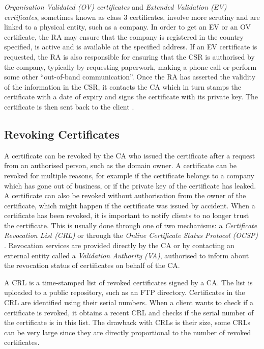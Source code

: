 \documentclass{style/kththesis}
\begin{document}
\emph{Organisation Validated (OV) certificates} and \emph{Extended Validation (EV) certificates}, sometimes known as class 3 certificates, involve more scrutiny and are linked to a physical entity, such as a company. In order to get an EV or an OV certificate, the RA may ensure that the company is registered in the country specified, is active and is available at the specified address. If an EV certificate is requested, the RA is also responsible for ensuring that the CSR is authorised by the company, typically by requesting paperwork, making a phone call or perform some other ``out-of-band communication''. Once the RA has asserted the validity of the information in the CSR, it contacts the CA which in turn stamps the certificate with a date of expiry and signs the certificate with its private key. The certificate is then sent back to the client \cite{Ford00}.

\subsection{Revoking Certificates}
A certificate can be revoked by the CA who issued the certificate after a request from an authorised person, such as the domain owner. A certificate can be revoked for multiple reasons, for example if the certificate belongs to a company which has gone out of business, or if the private key of the certificate has leaked. A certificate can also be revoked without authorisation from the owner of the certificate, which might happen if the certificate was issued by accident. When a certificate has been revoked, it is important to notify clients to no longer trust the certificate. This is usually done through one of two mechanisms: a \textit{Certificate Revocation List (CRL)} \cite{RFC5280} or through the \textit{Online Certificate Status Protocol (OCSP)} \cite{RFC6960}. Revocation services are provided directly by the CA or by contacting an external entity called a \emph{Validation Authority (VA)}, authorised to inform about the revocation status of certificates on behalf of the CA.

A CRL is a time-stamped list of revoked certificates signed by a CA. The list is uploaded to a public repository, such as an FTP directory. Certificates in the CRL are identified using their serial numbers. When a client wants to check if a certificate is revoked, it obtains a recent CRL and checks if the serial number of the certificate is in this list. The drawback with CRLs is their size, some CRLs can be very large since they are directly proportional to the number of revoked certificates.
\end{document}
